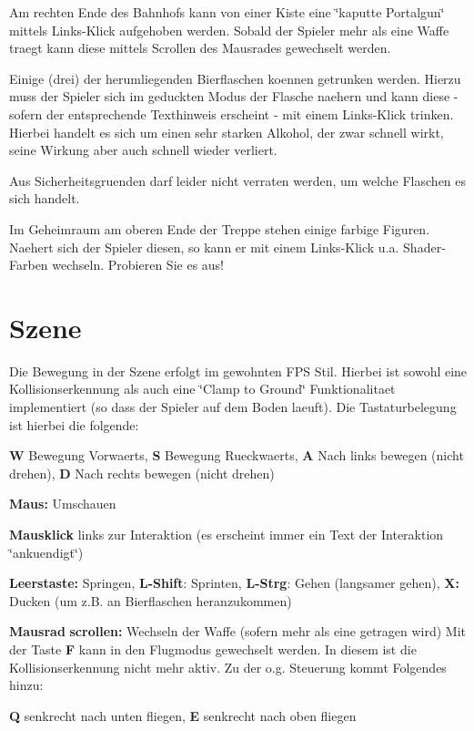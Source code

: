 \begin{DoxyItemize}
\item Am rechten Ende des Bahnhofs kann von einer Kiste eine \char`\"{}kaputte Portalgun\char`\"{} mittels Links-\/\+Klick aufgehoben werden. Sobald der Spieler mehr als eine Waffe traegt kann diese mittels Scrollen des Mausrades gewechselt werden.
\item Einige (drei) der herumliegenden Bierflaschen koennen getrunken werden. Hierzu muss der Spieler sich im geduckten Modus der Flasche naehern und kann diese -\/ sofern der entsprechende Texthinweis erscheint -\/ mit einem Links-\/\+Klick trinken. Hierbei handelt es sich um einen sehr starken Alkohol, der zwar schnell wirkt, seine Wirkung aber auch schnell wieder verliert.
\begin{DoxyItemize}
\item Aus Sicherheitsgruenden darf leider nicht verraten werden, um welche Flaschen es sich handelt.
\end{DoxyItemize}
\item Im Geheimraum am oberen Ende der Treppe stehen einige farbige Figuren. Naehert sich der Spieler diesen, so kann er mit einem Links-\/\+Klick u.\+a. Shader-\/\+Farben wechseln. Probieren Sie es aus!
\end{DoxyItemize}\hypertarget{index_Die}{}\section{Szene}\label{index_Die}
Die Bewegung in der Szene erfolgt im gewohnten F\+P\+S Stil. Hierbei ist sowohl eine Kollisionserkennung als auch eine \char`\"{}\+Clamp to Ground\char`\"{} Funktionalitaet implementiert (so dass der Spieler auf dem Boden laeuft). Die Tastaturbelegung ist hierbei die folgende\+:
\begin{DoxyItemize}
\item {\bfseries W} Bewegung Vorwaerts, {\bfseries S} Bewegung Rueckwaerts, {\bfseries A} Nach links bewegen (nicht drehen), {\bfseries D} Nach rechts bewegen (nicht drehen)
\item {\bfseries Maus\+:} Umschauen
\item {\bfseries Mausklick} links zur Interaktion (es erscheint immer ein Text der Interaktion \char`\"{}ankuendigt\char`\"{})
\item {\bfseries Leerstaste\+:} Springen, {\bfseries L-\/\+Shift}\+: Sprinten, {\bfseries L-\/\+Strg}\+: Gehen (langsamer gehen), {\bfseries X\+:} Ducken (um z.\+B. an Bierflaschen heranzukommen)
\item {\bfseries Mausrad} {\bfseries scrollen\+:} Wechseln der Waffe (sofern mehr als eine getragen wird) Mit der Taste {\bfseries F} kann in den Flugmodus gewechselt werden. In diesem ist die Kollisionserkennung nicht mehr aktiv. Zu der o.\+g. Steuerung kommt Folgendes hinzu\+:
\item {\bfseries Q} senkrecht nach unten fliegen, {\bfseries E} senkrecht nach oben fliegen
\end{DoxyItemize}

